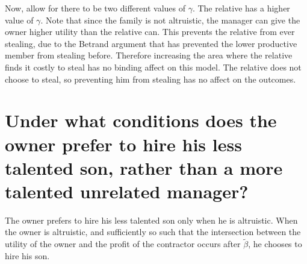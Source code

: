 \documentclass[12pt]{paper}
\begin{document}
Now, allow for there to be two different values of $\gamma$. The relative
has a higher value of $\gamma$. Note that since the family is not
altruistic, the manager can give the owner higher utility than the
relative can. This prevents the relative from ever stealing, due to
the Betrand argument that has prevented the lower productive member
from stealing before. Therefore increasing the area where the relative
finds it costly to steal has no binding affect on this model. The
relative does not choose to steal, so preventing him from stealing has
no affect on the outcomes.

\section{Under what conditions does the owner prefer to hire his less
  talented son, rather than a more talented unrelated manager?}

The owner prefers to hire his less talented son only when he is
altruistic. When the owner is altruistic, and sufficiently so such
that the intersection between the utility of the owner and the profit
of the contractor occurs after $\tilde{\beta}$, he chooses to hire his
son.  
\end{document}
